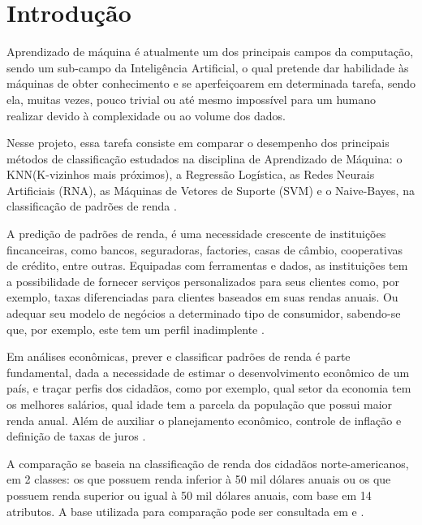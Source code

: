 \section{Introdução}
Aprendizado de máquina é atualmente um dos principais campos da computação, sendo um sub-campo da Inteligência Artificial, o qual pretende dar habilidade às máquinas de obter conhecimento e se aperfeiçoarem em determinada tarefa, sendo ela, muitas vezes, pouco trivial ou até mesmo impossível para um humano realizar devido à complexidade ou ao volume dos dados.

Nesse projeto, essa tarefa consiste em comparar o desempenho dos principais métodos de classificação estudados na disciplina de Aprendizado de Máquina: o KNN(K-vizinhos mais próximos), a Regressão Logística, as Redes Neurais Artificiais (RNA), as Máquinas de Vetores de Suporte (SVM) e o Naive-Bayes, na classificação de padrões de renda \cite{trabalho}.

A predição de padrões de renda, é uma necessidade crescente de instituições fincanceiras, como bancos, seguradoras, factories, casas de câmbio, cooperativas de crédito, entre outras. Equipadas com ferramentas e dados, as instituições tem a possibilidade de fornecer serviços personalizados para seus clientes como, por exemplo, taxas diferenciadas para clientes baseados em suas rendas anuais. Ou adequar seu modelo de negócios a determinado tipo de consumidor, sabendo-se que, por exemplo, este tem um perfil inadimplente \cite{importance}.

Em análises econômicas, prever e classificar padrões de renda é parte fundamental, dada a necessidade de estimar o desenvolvimento econômico de um país, e traçar perfis dos cidadãos, como por exemplo, qual setor da economia tem os melhores salários, qual idade tem a parcela da população que possui maior renda anual. Além de auxiliar o planejamento econômico, controle de inflação e definição de taxas de juros \cite{importance2}.

A comparação se baseia na classificação de renda dos cidadãos norte-americanos, em 2 classes: os que possuem renda inferior à 50 mil dólares anuais ou os que possuem renda superior ou igual à 50 mil dólares anuais, com base em 14 atributos. A base utilizada para comparação pode ser consultada em \cite{base} e \cite{base2}.